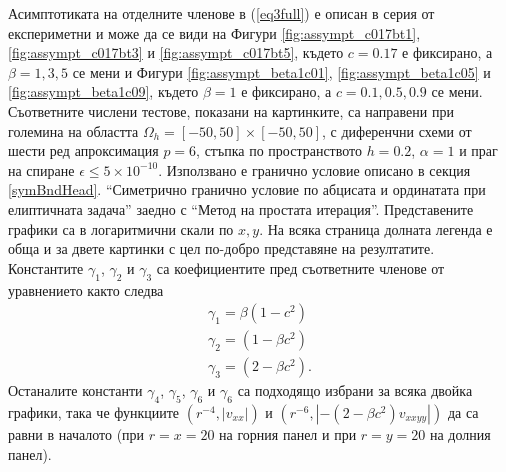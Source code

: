 \documentclass{article}
\newcommand{\rf}[1]{(\ref{#1})}
\theoremstyle{remark}
\begin{document}
Асимптотиката на отделните членове в \rf{eq3full} е описан в серия от експериметни и може да се види на Фигури \ref{fig:assympt_c017bt1}, \ref{fig:assympt_c017bt3} и \ref{fig:assympt_c017bt5}, където $c=0.17$ е фиксирано, а $\beta = 1, 3, 5$ се мени и Фигури \ref{fig:assympt_beta1c01}, \ref{fig:assympt_beta1c05} и \ref{fig:assympt_beta1c09}, където $\beta=1$ е фиксирано, а $c = 0.1, 0.5, 0.9$ се мени. Съответните числени тестове, показани на картинките, са направени при големина на областта $\Omega_h = [-50, 50] \times [-50, 50]$, с диференчни схеми от шести ред апроксимация $p=6$, стъпка по пространството $h=0.2$, $\alpha = 1$ и праг на спиране $\epsilon \le 5 \times 10^{-10}$. Използвано е гранично условие описано в секция \ref{symBndHead}. ``Симетрично гранично условие по абцисата и ординатата при елиптичната задача'' заедно с ``Метод на простата итерация''. Представените графики са в логаритмични скали по $x,y$. На всяка страница долната легенда е обща и за двете картинки с цел по-добро представяне на резултатите. Константите $\gamma_1$, $\gamma_2$ и $\gamma_3$ са коефициентите пред съответните членове от уравнението както следва
\begin{align*}
\gamma_1 = \beta (1-c^2) \\
\gamma_2 = (1-\beta c^2) \\
\gamma_3 = (2-\beta c^2).
\end{align*}
Останалите константи $\gamma_4$, $\gamma_5$, $\gamma_6$ и $\gamma_6$ са подходящо избрани за всяка двойка графики, така че функциите $(r^{-4}, |v_{xx}|)$ и $(r^{-6}, |- (2-\beta c^2)v_{xxyy}|)$ да са равни в началото (при $r=x=20$ на горния панел и при $r=y=20$ на долния панел).
\end{document}
